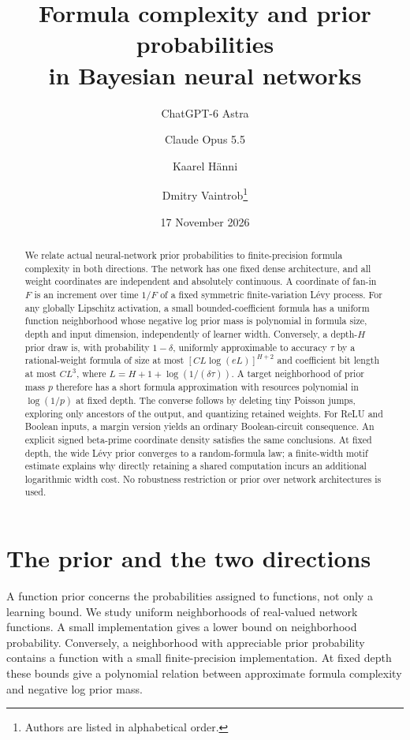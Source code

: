 \documentclass[11pt]{article}
\title{Formula complexity and prior probabilities\\in Bayesian neural networks}
\author{ChatGPT-6 Astra \and Claude Opus 5.5 \and Kaarel H\"anni \and Dmitry Vaintrob\thanks{Authors are listed in alphabetical order.}}
\date{17 November 2026}
\begin{document}
\maketitle
\begin{abstract}
We relate actual neural-network prior probabilities to finite-precision formula complexity in both directions. The network has one fixed dense architecture, and all weight coordinates are independent and absolutely continuous. A coordinate of fan-in $F$ is an increment over time $1/F$ of a fixed symmetric finite-variation L\'evy process. For any globally Lipschitz activation, a small bounded-coefficient formula has a uniform function neighborhood whose negative log prior mass is polynomial in formula size, depth and input dimension, independently of learner width. Conversely, a depth-$H$ prior draw is, with probability $1-\delta$, uniformly approximable to accuracy $\tau$ by a rational-weight formula of size at most $[CL\log(eL)]^{H+2}$ and coefficient bit length at most $CL^3$, where $L=H+1+\log(1/(\delta\tau))$. A target neighborhood of prior mass $p$ therefore has a short formula approximation with resources polynomial in $\log(1/p)$ at fixed depth. The converse follows by deleting tiny Poisson jumps, exploring only ancestors of the output, and quantizing retained weights. For ReLU and Boolean inputs, a margin version yields an ordinary Boolean-circuit consequence. An explicit signed beta-prime coordinate density satisfies the same conclusions. At fixed depth, the wide L\'evy prior converges to a random-formula law; a finite-width motif estimate explains why directly retaining a shared computation incurs an additional logarithmic width cost. No robustness restriction or prior over network architectures is used.
\end{abstract}

\section{The prior and the two directions}
A function prior concerns the probabilities assigned to functions, not only a learning bound. We study uniform neighborhoods of real-valued network functions. A small implementation gives a lower bound on neighborhood probability. Conversely, a neighborhood with appreciable prior probability contains a function with a small finite-precision implementation. At fixed depth these bounds give a polynomial relation between approximate formula complexity and negative log prior mass.
\end{document}

